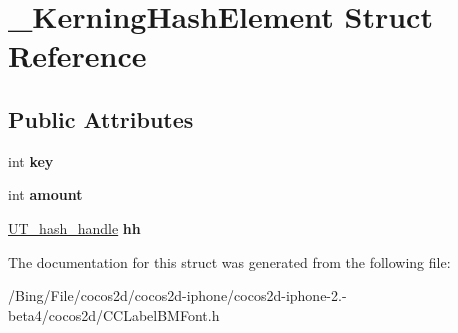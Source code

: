 \hypertarget{struct___kerning_hash_element}{\section{\-\_\-\-Kerning\-Hash\-Element Struct Reference}
\label{struct___kerning_hash_element}
}
\subsection*{Public Attributes}
\begin{DoxyCompactItemize}
\item 
\hypertarget{struct___kerning_hash_element_a3d5a9cd723f885a8d24b75bb0289ce1d}{int {\bfseries key}}\label{struct___kerning_hash_element_a3d5a9cd723f885a8d24b75bb0289ce1d}

\item 
\hypertarget{struct___kerning_hash_element_a51a9c100050c2ab56431798e59509100}{int {\bfseries amount}}\label{struct___kerning_hash_element_a51a9c100050c2ab56431798e59509100}

\item 
\hypertarget{struct___kerning_hash_element_a1438adce8be9c5fde6f185595d3af254}{\hyperlink{struct_u_t__hash__handle}{U\-T\-\_\-hash\-\_\-handle} {\bfseries hh}}\label{struct___kerning_hash_element_a1438adce8be9c5fde6f185595d3af254}

\end{DoxyCompactItemize}


The documentation for this struct was generated from the following file\-:\begin{DoxyCompactItemize}
\item 
/\-Bing/\-File/cocos2d/cocos2d-\/iphone/cocos2d-\/iphone-\/2.-\/beta4/cocos2d/C\-C\-Label\-B\-M\-Font.\-h\end{DoxyCompactItemize}

